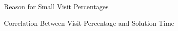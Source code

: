 \begin{figure}[tb]
\begin{center}
\end{center}
\caption{Reason for Small Visit Percentages}
\label{fig:SMPdesign:Reason for Small Visit Percentages}
\end{figure}

\begin{figure}[tb]
\begin{center}
\end{center}
\caption{Correlation Between Visit Percentage and Solution Time}
\label{fig:SMPdesign:Correlation Between Visit Percentage and Solution Time}
\end{figure}

